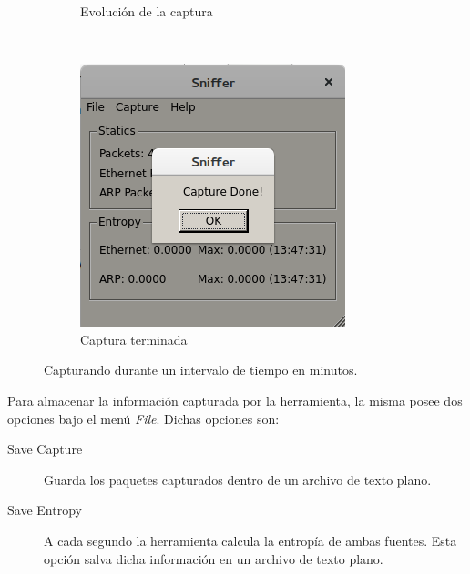 \begin{figure}[h!]
\begin{subfigure}[b]{0.3\textwidth}
                \caption{Evolución de la captura}
        \end{subfigure}
        ~ %
        \begin{subfigure}[b]{0.3\textwidth}
                \includegraphics[width=\textwidth]{graficos/tool/tool_done}
                \caption{Captura terminada}
        \end{subfigure}
        \caption{Capturando durante un intervalo de tiempo en minutos.}\label{fig:interval}
\end{figure}

\newpage

Para almacenar la información capturada por la herramienta, la misma posee dos opciones bajo el menú \emph{File}. Dichas opciones son:

\begin{description}
	\item[Save Capture]	Guarda los paquetes capturados dentro de un archivo de texto plano.
	\item[Save Entropy] A cada segundo la herramienta calcula la entropía de ambas fuentes. Esta opción salva dicha información en un archivo de texto plano.
\end{description}

